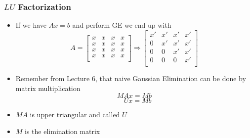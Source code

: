 \documentclass[10pt]{beamer}
\begin{document}
\begin{frame}
\frametitle{$LU$ Factorization}
\begin{itemize}
    \item If we have $Ax=b$ and perform GE we end up with
\begin{equation*}
    A = 
    \begin{bmatrix}
    x & x & x & x\\
    x & x & x & x\\
    x & x & x & x\\
    x & x & x & x\\
    \end{bmatrix}
    \Rightarrow
    \begin{bmatrix}
    x' & x' & x' & x'\\
    0  & x' & x' & x'\\
    0  & 0  & x' & x'\\
    0  & 0  & 0  & x'\\
    \end{bmatrix}
\end{equation*}
    \item Remember from Lecture 6, that naive Gaussian Elimination can be done by matrix multiplication
        \[ MAx = Mb \] 
        \[ \phantom{M}Ux = Mb \] 
    \item $MA$ is upper triangular and called $U$
    \item $M$ is the elimination matrix
\end{itemize}
\end{frame}
\end{document}
